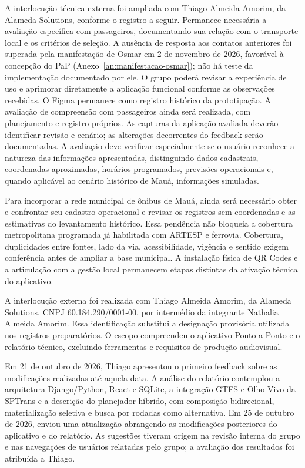 \documentclass[12pt,oneside,a4paper,brazil,chapter=TITLE]{abntex2}
\begin{document}
A interlocução técnica externa foi ampliada com Thiago Almeida Amorim, da Alameda Solutions, conforme o registro a seguir. Permanece necessária a avaliação específica com passageiros, documentando sua relação com o transporte local e os critérios de seleção. A ausência de resposta aos contatos anteriores foi superada pela manifestação de Osmar em 2 de novembro de 2026, favorável à concepção do PaP (Anexo~\ref{an:manifestacao-osmar}); não há teste da implementação documentado por ele. O grupo poderá revisar a experiência de uso e aprimorar diretamente a aplicação funcional conforme as observações recebidas. O Figma permanece como registro histórico da prototipação. A avaliação de compreensão com passageiros ainda será realizada, com planejamento e registro próprios. As capturas da aplicação avaliada deverão identificar revisão e cenário; as alterações decorrentes do feedback serão documentadas. A avaliação deve verificar especialmente se o usuário reconhece a natureza das informações apresentadas, distinguindo dados cadastrais, coordenadas aproximadas, horários programados, previsões operacionais e, quando aplicável ao cenário histórico de Mauá, informações simuladas.

Para incorporar a rede municipal de ônibus de Mauá, ainda será necessário obter e confrontar seu cadastro operacional e revisar os registros sem coordenadas e as estimativas do levantamento histórico. Essa pendência não bloqueia a cobertura metropolitana programada já habilitada com ARTESP e ferrovia. Cobertura, duplicidades entre fontes, lado da via, acessibilidade, vigência e sentido exigem conferência antes de ampliar a base municipal. A instalação física de QR Codes e a articulação com a gestão local permanecem etapas distintas da ativação técnica do aplicativo.

\begingroup\setlength{\parskip}{8pt}
A interlocução externa foi realizada com Thiago Almeida Amorim, da Alameda Solutions, CNPJ 60.184.290/0001-00, por intermédio da integrante Nathalia Almeida Amorim. Essa identificação substitui a designação provisória utilizada nos registros preparatórios. O escopo compreendeu o aplicativo Ponto a Ponto e o relatório técnico, excluindo ferramentas e requisitos de produção audiovisual.

Em 21 de outubro de 2026, Thiago apresentou o primeiro feedback sobre as modificações realizadas até aquela data. A análise do relatório contemplou a arquitetura Django/Python, React e SQLite, a integração GTFS e Olho Vivo da SPTrans e a descrição do planejador híbrido, com composição bidirecional, materialização seletiva e busca por rodadas como alternativa. Em 25 de outubro de 2026, enviou uma atualização abrangendo as modificações posteriores do aplicativo e do relatório. As sugestões tiveram origem na revisão interna do grupo e nas navegações de usuários relatadas pelo grupo; a avaliação dos resultados foi atribuída a Thiago.
\end{document}

